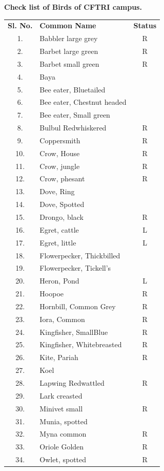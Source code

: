 \begin{center}
\smallskip
\textbf{Check list of Birds of CFTRI campus.}
\end{center}
\begin{longtable}{cp{5cm}c}
\textbf{Sl. No.} &  \textbf{Common Name}  & \textbf{Status}\\
1. & Babbler large grey & R \\
2. & Barbet large green & R \\
3. & Barbet small green & R \\
4. & Baya & \\
5. & Bee eater, Bluetailed & \\
6. & Bee eater, Chestnut headed & \\
7. & Bee eater, Small green & \\
8. & Bulbul Redwhiskered & R \\
9. & Coppersmith & R \\
10.& Crow, House & R  \\
11.& Crow, jungle & R \\
12.& Crow, phesant & R \\
13.& Dove, Ring & \\
14.& Dove, Spotted &\\  
15.& Drongo, black & R\\ 
16.& Egret, cattle & L \\
17.& Egret, little & L \\
18.& Flowerpecker, Thickbilled & \\
19.& Flowerpecker, Tickell's & \\
20.& Heron, Pond & L \\
21.& Hoopoe &  R \\
22.& Hornbill, Common Grey & R \\
23.& Iora, Common & R \\
24.& Kingfisher, SmallBlue & R \\
25.& Kingfisher, Whitebreasted & R\\  
26.& Kite, Pariah &R \\
27.& Koel &\\ 
28.& Lapwing Redwattled &R \\
29.& Lark creasted &\\
30.& Minivet small &R \\
31.& Munia, spotted & \\
32.& Myna common &R \\
33.& Oriole Golden &R \\
34.& Owlet, spotted &R \\

\end{longtable}
